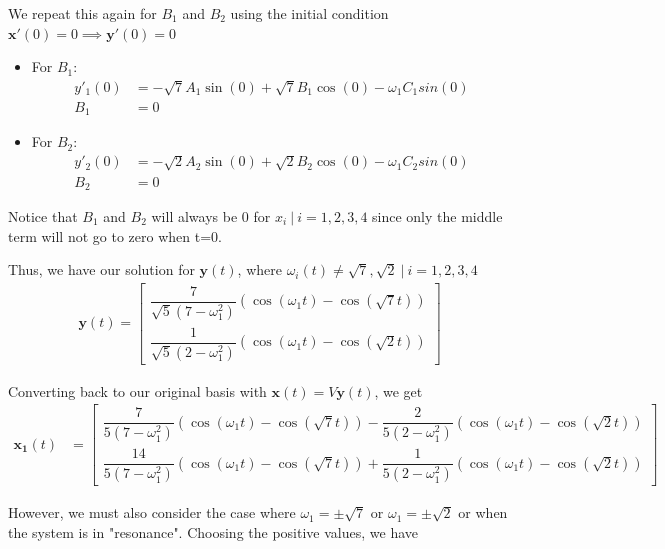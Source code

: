 \documentclass[12pt]{article}
\begin{document}
We repeat this again for $B_1$ and $B_2$ using the initial condition $\mathbf{x}'(0) = 0 \implies{} \mathbf{y}'(0) = 0$
\begin{itemize}
    \item For $B_1$:
          \begin{align*}
              y'_1(0) & = -\sqrt{7}A_1\sin(0) + \sqrt{7}B_1\cos(0) - \omega_{1} C_1 sin(0) \\
              B_1     & = 0
          \end{align*}
    \item For $B_2$:
          \begin{align*}
              y'_2(0) & = -\sqrt{2}A_2\sin(0) + \sqrt{2}B_2\cos(0) - \omega_{1} C_2 sin(0) \\
              B_2     & = 0
          \end{align*}
\end{itemize}

Notice that $B_1$ and $B_2$ will always be 0 for $x_i ~|~ i = 1,2,3,4$ since only the middle term will not go to zero when t=0.


Thus, we have our solution for $\mathbf{y}(t)$, where $\omega_{i}(t) \neq{\sqrt{7}},\sqrt{2} ~|~ i = 1,2,3,4$
\begin{align*}
    \mathbf{y}(t) = \begin{bmatrix}
                        \dfrac{7}{\sqrt{5}(7-\omega_1^2)}(\cos(\omega_{1}t) -\cos(\sqrt{7}t)) \\
                        \dfrac{1}{\sqrt{5}(2-\omega_1^2)}(\cos(\omega_{1}t) -\cos(\sqrt{2}t))
                    \end{bmatrix}
\end{align*}

Converting back to our original basis with $\mathbf{x}(t) = V\mathbf{y}(t)$, we get
\begin{align*}
    \mathbf{x_1}(t) & = \begin{bmatrix}
                            \dfrac{7}{5(7-\omega_1^2)}(\cos(\omega_{1}t) -\cos(\sqrt{7}t)) - \dfrac{2}{5(2-\omega_1^2)}(\cos(\omega_{1}t) -\cos(\sqrt{2}t)) \\
                            \dfrac{14}{5(7-\omega_1^2)}(\cos(\omega_{1}t) -\cos(\sqrt{7}t)) + \dfrac{1}{5(2-\omega_1^2)}(\cos(\omega_{1}t) -\cos(\sqrt{2}t))
                        \end{bmatrix}
\end{align*}

However, we must also consider the case where $\omega_1 = \pm{}\sqrt{7}$ or $\omega_1 = \pm{}\sqrt{2}$ or when the system is in "resonance". Choosing the positive values, we have
\end{document}
